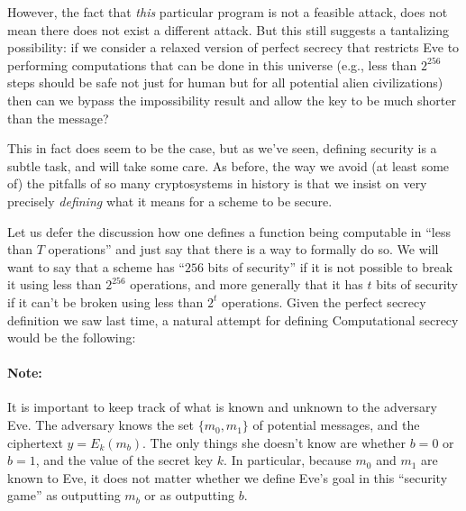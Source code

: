 However, the fact that \emph{this} particular program is not a feasible
attack, does not mean there does not exist a different attack. But this
still suggests a tantalizing possibility: if we consider a relaxed
version of perfect secrecy that restricts Eve to performing computations
that can be done in this universe (e.g., less than \(2^{256}\) steps
should be safe not just for human but for all potential alien
civilizations) then can we bypass the impossibility result and allow the
key to be much shorter than the message?

This in fact does seem to be the case, but as we've seen, defining
security is a subtle task, and will take some care. As before, the way
we avoid (at least some of) the pitfalls of so many cryptosystems in
history is that we insist on very precisely \emph{defining} what it
means for a scheme to be secure.

Let us defer the discussion how one defines a function being computable
in ``less than \(T\) operations'' and just say that there is a way to
formally do so. We will want to say that a scheme has ``\(256\) bits of
security'' if it is not possible to break it using less than \(2^{256}\)
operations, and more generally that it has \(t\) bits of security if it
can't be broken using less than \(2^t\) operations. Given the perfect
secrecy definition we saw last time, a natural attempt for defining
Computational secrecy would be the following:

\hypertarget{firstcompdef}{}

\paragraph{Note:} It is important to keep track of what is known and
unknown to the adversary Eve. The adversary knows the set
\(\{ m_0,m_1 \}\) of potential messages, and the ciphertext
\(y=E_k(m_b)\). The only things she doesn't know are whether \(b=0\) or
\(b=1\), and the value of the secret key \(k\). In particular, because
\(m_0\) and \(m_1\) are known to Eve, it does not matter whether we
define Eve's goal in this ``security game'' as outputting \(m_b\) or as
outputting \(b\).

